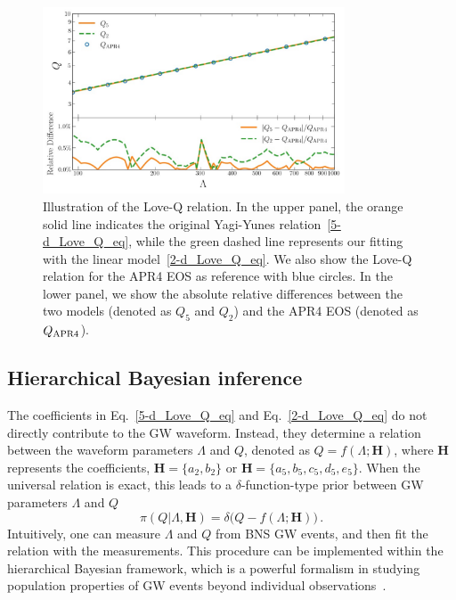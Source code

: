 \documentclass[a4paper,11pt]{article}
\begin{document}
\begin{figure}[tbp]
\centering
\includegraphics[width=0.8\textwidth]{fig_2d-5d_difference.pdf}
\caption{Illustration of the Love-Q relation. In the upper panel, the orange
solid line indicates the original Yagi-Yunes relation~\eqref{5-d_Love_Q_eq},
while the green dashed line represents our fitting with the linear
model~\eqref{2-d_Love_Q_eq}. We also show the Love-Q relation for the APR4 EOS
as reference with blue circles.  In the lower panel, we show the absolute
relative differences between the two models (denoted as $Q_5$ and $Q_2$) and the
APR4 EOS (denoted as $Q_{\rm APR4}$).}\label{relative_difference}
\end{figure}

\subsection{Hierarchical Bayesian inference}
\label{subsec:framework_principles}

The coefficients in Eq.~\eqref{5-d_Love_Q_eq} and Eq.~\eqref{2-d_Love_Q_eq} do
not directly contribute to the GW waveform. Instead, they determine a relation
between the waveform parameters $\Lambda$ and $Q$, denoted as
$Q=f(\Lambda;\bm{H})$, where $\bm{H}$ represents the coefficients, $\bm{H} =
\{a_2, b_2\}$ or $\bm{H} = \{a_5, b_5, c_5, d_5, e_5\}$. When the universal
relation is exact, this leads to a $\delta$-function-type prior between GW
parameters $\Lambda$ and $Q$
\begin{equation}
\label{delta function prior}
\pi(Q|\Lambda,\bm{H}) = \delta\big(Q-f(\Lambda;\bm{H})\big)\,.
\end{equation}
Intuitively, one can measure $\Lambda$ and $Q$ from BNS GW events, and then fit
the relation with the measurements. This procedure can be implemented within the
hierarchical Bayesian framework, which is a powerful formalism in studying population
properties of GW events beyond individual observations~\cite{Thrane_2019}. 
\end{document}
